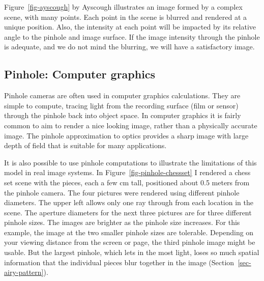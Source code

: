 \documentclass[
  letterpaper,
]{book}
\begin{document}
Figure~\ref{fig-ayscough} by Ayscough illustrates an image formed by a
complex scene, with many points. Each point in the scene is blurred and
rendered at a unique position. Also, the intensity at each point will be
impacted by its relative angle to the pinhole and image surface. If the
image intensity through the pinhole is adequate, and we do not mind the
blurring, we will have a satisfactory image.

\subsection{Pinhole: Computer graphics}\label{pinhole-computer-graphics}

Pinhole cameras are often used in computer graphics calculations. They
are simple to compute, tracing light from the recording surface (film or
sensor) through the pinhole back into object space. In computer graphics
it is fairly common to aim to render a nice looking image, rather than a
physically accurate image. The pinhole approximation to optics provides
a sharp image with large depth of field that is suitable for many
applications.

It is also possible to use pinhole computations to illustrate the
limitations of this model in real image systems. In
Figure~\ref{fig-pinhole-chessset} I rendered a chess set scene with the
pieces, each a few cm tall, positioned about 0.5 meters from the pinhole
camera. The four pictures were rendered using different pinhole
diameters. The upper left allows only one ray through from each location
in the scene. The aperture diameters for the next three pictures are for
three different pinhole sizes. The images are brighter as the pinhole
size increases. For this example, the image at the two smaller pinhole
sizes are tolerable. Depending on your viewing distance from the screen
or page, the third pinhole image might be usable. But the largest
pinhole, which lets in the most light, loses so much spatial information
that the individual pieces blur together in the image
(Section~\ref{sec-airy-pattern}).
\end{document}
